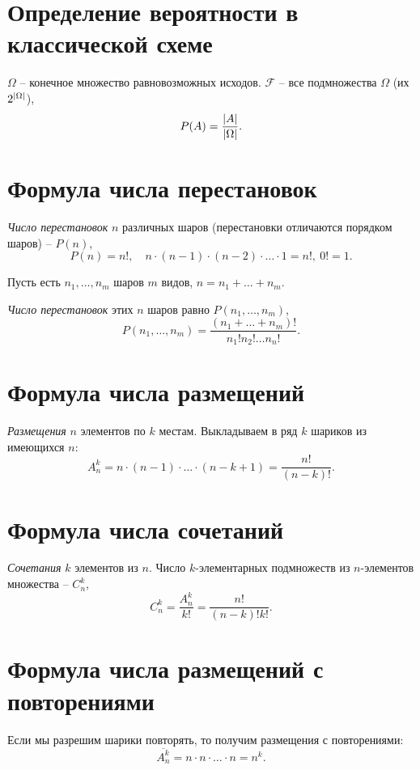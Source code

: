 \newpage

\section{Определение вероятности в классической схеме}

\begin{definition}
	$\Omega $ -- конечное множество равновозможных исходов. $\mathcal{F}$ -- все подмножества $\Omega $ (их $2^{\left\lvert \Omega \right\rvert } $),
	\[
		P(A) = \frac{\left\lvert A\right\rvert }{\left\lvert \Omega \right\rvert } .
	\]
\end{definition}

\section{Формула числа перестановок}

\begin{definition}
	\emph{Число перестановок} $n$ различных шаров (перестановки отличаются порядком шаров) -- $P(n)$,
	\[
		P(n) = n!, \quad n \cdot (n-1)\cdot (n-2)\cdot \ldots \cdot 1 = n!, \ 0! = 1.
	\]

	Пусть есть $n_1,\ldots,n_m$ шаров $m$ видов, $n =n_1 + \ldots + n_m$.

	\emph{Число перестановок} этих $n$ шаров равно $P(n_1,\ldots ,n_m)$,
	\[
		P(n_1,\ldots ,n_m) = \frac{(n_1 + \ldots  + n_m)!}{n_1!n_2!\ldots n_n!}.
	\]
\end{definition}

\section{Формула числа размещений}

\begin{definition}
	\emph{Размещения} $n$ элементов по $k$ местам. Выкладываем в ряд $k$ шариков из имеющихся $n$:
	\[
		A_{n}^{k} = n \cdot (n-1)\cdot \ldots \cdot (n-k+1) = \frac{n!}{(n-k)!} .
	\]
\end{definition}

\section{Формула числа сочетаний}

\begin{definition}
	\emph{Сочетания} $k$ элементов из $n$. Число $k$-элементарных подмножеств из $n$-элементов множества -- $C_{n}^{k} $,
	\[
		C_{n}^{k} = \frac{A_{n}^{k}}{k!} = \frac{n!}{(n-k)!k!}.
	\]
\end{definition}

\section{Формула числа размещений с повторениями}

\begin{remark}
	Если мы разрешим шарики повторять, то получим размещения с повторениями:
	\[
		\overline{A_{n}^{k}} = n \cdot n \cdot \ldots \cdot n = n^k.
	\]
\end{remark}
